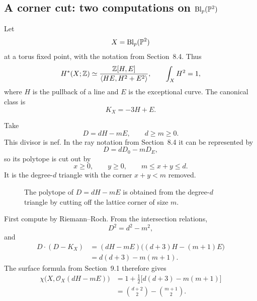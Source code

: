 \subsection{A corner cut: two computations on
\texorpdfstring{\(\operatorname{Bl}_p(\mathbb{P}^2)\)}{Blp(P2)}}

Let
\[
X=\operatorname{Bl}_p(\mathbb{P}^2)
\]
at a torus fixed point, with the notation from Section~8.4.  Thus
\[
H^*(X;\mathbb{Z})
\simeq
\frac{\mathbb{Z}[H,E]}{\langle HE,H^2+E^2\rangle},
\qquad
\int_XH^2=1,
\]
where \(H\) is the pullback of a line and \(E\) is the exceptional
curve.  The canonical class is
\[
K_X=-3H+E.
\]

Take
\[
D=dH-mE,
\qquad
d\geq m\geq0.
\]
This divisor is nef.  In the ray notation from Section~8.4 it can be
represented by
\[
D=dD_0-mD_E,
\]
so its polytope is cut out by
\[
x\geq0,
\qquad
y\geq0,
\qquad
m\leq x+y\leq d.
\]
It is the degree-\(d\) triangle with the corner
\(x+y<m\) removed.

\begin{figure}[htbp]
\centering
{}
\caption{The polytope of \(D=dH-mE\) is obtained from the degree-\(d\)
triangle by cutting off the lattice corner of size \(m\).}
\label{fig:blowup-rr-corner-cut}
\end{figure}

First compute by Riemann--Roch.  From the intersection relations,
\[
D^2=d^2-m^2,
\]
and
\[
\begin{aligned}
D\cdot(D-K_X)
&=(dH-mE)\bigl((d+3)H-(m+1)E\bigr)
\\
&=d(d+3)-m(m+1).
\end{aligned}
\]
The surface formula from Section~9.1 therefore gives
\[
\begin{aligned}
\chi\bigl(X,\mathcal O_X(dH-mE)\bigr)
&=1+\frac12\bigl[d(d+3)-m(m+1)\bigr]
\\
&=
\binom{d+2}{2}-\binom{m+1}{2}.
\end{aligned}
\]

